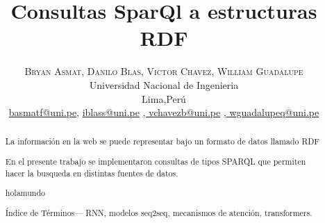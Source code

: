 \documentclass[conference]{IEEEtran}
\begin{document}
\title{\bf{Consultas SparQl a estructuras RDF}}

\author{%
\textsc{Bryan Asmat}\textsc{, Danilo Blas}\textsc{, Victor Chavez}\textsc{, William Guadalupe}\\
\normalsize Universidad Nacional de Ingenieria \\ %
\normalsize Lima,Perú \\ %
\normalsize \href{mailto:basmatf@uni.pe}{basmatf@uni.pe},  \href{mailto:iblass@uni.pe}{iblass@uni.pe} \href{mailto:vchavezb@uni.pe}{,  vchavezb@uni.pe} \href{mailto:wguadalupeq@uni.pe}{,  wguadalupeq@uni.pe} %
}





\maketitle

\begin{abstract}
La información en la web se puede representar bajo un formato de datos llamado RDF

En el presente trabajo se implementaron consultas de tipos SPARQL que permiten hacer la busqueda en distintas fuentes de datos.

holamundo

\vspace{0.2cm}


\'Indice de T\'erminos— RNN, modelos seq2seq, mecanismos de atenci\'on, transformers.
    
\end{abstract}
\end{document}

